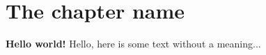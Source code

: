 \documentclass[../../main.tex]{subfiles}
\begin{document}
    \section{The chapter name}
    \textbf{Hello world!}
    Hello, here is some text without a meaning...

    \pagebreak
\end{document}
